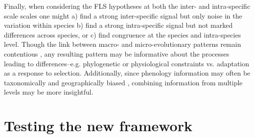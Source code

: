 \documentclass{article}
\begin{document}
Finally, when considering the FLS hypotheses at both the inter- and intra-specific scale scales one might a) find a strong inter-specific signal but only noise in the variation within species b) find a strong intra-specific signal but not marked differences across species, or c) find congruence at the species and intra-species level. Though the link between macro- and micro-evolutionary patterns remain contentious \citep{Violle2012,Shipley2016,Anderegg2018}, any resulting pattern may be informative about the processes leading to differences--e.g. phylogenetic or physiological constraints  vs. adaptation as a response to selection. Additionally, since phenology information may often be taxonomically and geographically biased \citep{Wolkovich2014,Willis2017}, combining information from multiple levels may be more insightful.\\

 



\section*{Testing the new framework}
\end{document}

